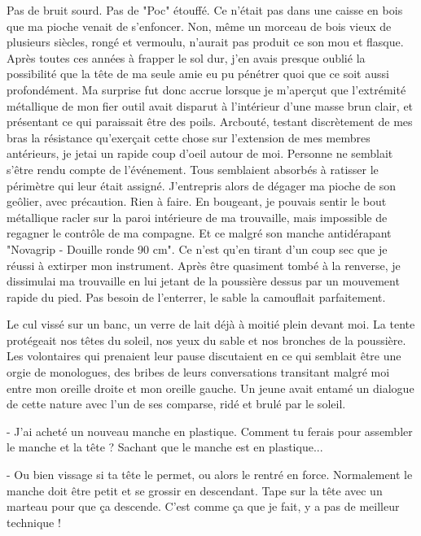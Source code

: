 \documentclass[12pt,a4paper,article]{memoir} %
\begin{document}
Pas de bruit sourd. Pas de "Poc" \'{e}touff\'{e}. Ce n'\'{e}tait pas dans une caisse en bois que ma pioche venait de s'enfoncer. Non, m\^{e}me un morceau de bois vieux de plusieurs si\`{e}cles, rong\'{e} et vermoulu, n'aurait pas produit ce son mou et flasque. Apr\`{e}s toutes ces ann\'{e}es \`{a} frapper le sol dur, j'en avais presque oubli\'{e} la possibilit\'{e} que la t\^{e}te de ma seule amie eu pu p\'{e}n\'{e}trer quoi que ce soit aussi profond\'{e}ment. Ma surprise fut donc accrue lorsque je m'aper\c{c}ut que l'extr\'{e}mit\'{e} m\'{e}tallique de mon fier outil avait disparut \`{a} l'int\'{e}rieur d'une masse brun clair, et pr\'{e}sentant ce qui paraissait \^{e}tre des poils. Arcbout\'{e}, testant discr\`{e}tement de mes bras la r\'{e}sistance qu'exer\c{c}ait cette chose sur l'extension de mes membres ant\'{e}rieurs, je jetai un rapide coup d'oeil autour de moi. Personne ne semblait s'\^{e}tre rendu compte de l'\'{e}v\'{e}nement. Tous semblaient absorb\'{e}s \`{a} ratisser le p\'{e}rim\`{e}tre qui leur \'{e}tait assign\'{e}. J'entrepris alors de d\'{e}gager ma pioche de son ge\^{o}lier, avec pr\'{e}caution. Rien \`{a} faire. En bougeant, je pouvais sentir le bout m\'{e}tallique racler sur la paroi int\'{e}rieure de ma trouvaille, mais impossible de regagner le contr\^{o}le de ma compagne. Et ce malgr\'{e} son manche antid\'{e}rapant "Novagrip - Douille ronde 90 cm". Ce n'est qu'en tirant d'un coup sec que je r\'{e}ussi \`{a} extirper mon instrument. Apr\`{e}s \^{e}tre quasiment tomb\'{e} \`{a} la renverse, je dissimulai ma trouvaille en lui jetant de la poussi\`{e}re dessus par un mouvement rapide du pied. Pas besoin de l'enterrer, le sable la camouflait parfaitement.


Le cul viss\'{e} sur un banc, un verre de lait d\'{e}j\`{a} \`{a} moiti\'{e} plein devant moi. La tente prot\'{e}geait nos t\^{e}tes du soleil, nos yeux du sable et nos bronches de la poussi\`{e}re. Les volontaires qui prenaient leur pause discutaient en ce qui semblait \^{e}tre une orgie de monologues, des bribes de leurs conversations transitant malgr\'{e} moi entre mon oreille droite et mon oreille gauche. Un jeune avait entam\'{e} un dialogue de cette nature avec l'un de ses comparse, rid\'{e} et brul\'{e} par le soleil.

	- J'ai achet\'{e} un nouveau manche en plastique.
	Comment tu ferais pour assembler le manche et la t\^{e}te ?
	Sachant que le manche est en plastique...
	
	- Ou bien vissage si ta t\^{e}te le permet, ou alors le rentr\'{e} en force.
	Normalement le manche doit \^{e}tre petit et se grossir en descendant.
	Tape sur la t\^{e}te avec un marteau pour que \c{c}a descende.
	C'est comme \c{c}a que je fait, y a pas de meilleur technique !
\end{document}
